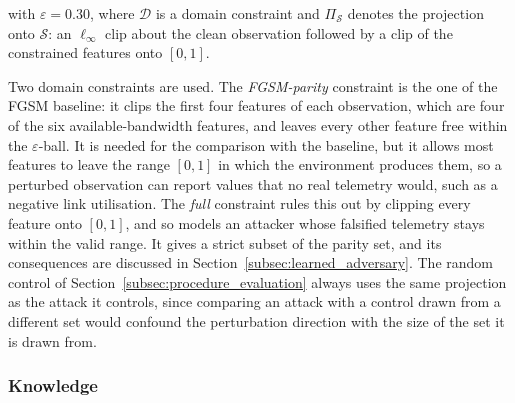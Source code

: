 \noindent with $\varepsilon = 0.30$, where $\mathcal{D}$ is a domain constraint and
$\Pi_{\mathcal{S}}$ denotes the projection onto $\mathcal{S}$: an $\ell_\infty$ clip
about the clean observation followed by a clip of the constrained features onto $[0,1]$.

Two domain constraints are used. The \emph{FGSM-parity} constraint is the one of the FGSM
baseline: it clips the first four features of each observation, which are four of the six
available-bandwidth features, and leaves every other feature free within the
$\varepsilon$-ball. It is needed for the comparison with the baseline, but it allows most
features to leave the range $[0,1]$ in which the environment produces them, so a
perturbed observation can report values that no real telemetry would, such as a negative
link utilisation. The \emph{full} constraint rules this out by clipping every feature onto
$[0,1]$, and so models an attacker whose falsified telemetry stays within the valid
range. It gives a strict subset of the parity set, and its consequences are discussed in
Section~\ref{subsec:learned_adversary}. The random control of
Section~\ref{subsec:procedure_evaluation} always uses the same projection as the attack
it controls, since comparing an attack with a control drawn from a different set would
confound the perturbation direction with the size of the set it is drawn from.

\subsubsection*{Knowledge}

